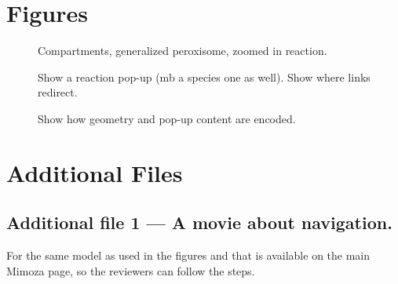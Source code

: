\documentclass{bmcart}
\begin{document}
\begin{backmatter}

\section*{Figures}
  \begin{figure}[h!]
  \caption{
  \label{zoom_levels}
      Compartments, generalized peroxisome, zoomed in reaction.}
      \end{figure}

\begin{figure}[h!]
  \caption{
  \label{pop_up}
      Show a reaction pop-up (mb a species one as well). Show where links redirect.}
      \end{figure}
      
\begin{figure}[h!]
  \caption{
  \label{geojson}
      Show how geometry and pop-up content are encoded.}
      \end{figure}




\section*{Additional Files}
  \subsection*{Additional file 1 --- A movie about navigation.}
   For the same model as used in the figures and that is available on the main Mimoza page, so the reviewers can follow the steps.


\end{backmatter}
\end{document}
